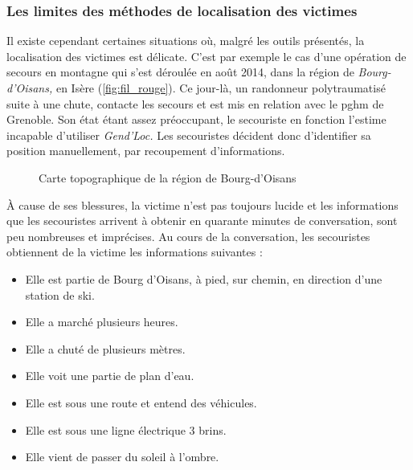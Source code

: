 \subsubsection{Les limites des méthodes de localisation des victimes}
\label{subsec:1-1-2-3}

Il existe cependant certaines situations où, malgré les outils
présentés, la localisation des victimes est délicate. C'est par
exemple le cas d'une opération de secours en montagne qui s'est
déroulée en août 2014, dans la région de \emph{Bourg-d'Oisans,} en
Isère (\autoref{fig:fil_rouge}). Ce jour-là, un randonneur
polytraumatisé suite à une chute, contacte les secours et est mis en
relation avec le \ac{pghm} de Grenoble. Son état étant assez
préoccupant, le secouriste en fonction l'estime incapable d'utiliser
\emph{Gend'Loc.} Les secouristes décident donc d'identifier sa
position manuellement, par recoupement d'informations.

\begin{figure}
  \centering
  
  \caption{Carte topographique de la région de Bourg-d'Oisans}
  \label{fig:fil_rouge}
\end{figure}

À cause de ses blessures, la victime n'est pas toujours lucide et les
informations que les secouristes arrivent à obtenir en quarante
minutes de conversation, sont peu nombreuses et imprécises. Au cours
de la conversation, les secouristes obtiennent de la victime les
informations suivantes :

\begin{itemize}
\item Elle est partie de Bourg d'Oisans, à pied, sur chemin, en
  direction d'une station de ski.
\item Elle a marché plusieurs heures.
\item Elle a chuté de plusieurs mètres.
\item Elle voit une partie de plan d'eau.
\item Elle est sous une route et entend des véhicules.
\item Elle est sous une ligne électrique 3 brins.
\item Elle vient de passer du soleil à l'ombre.
\end{itemize}

